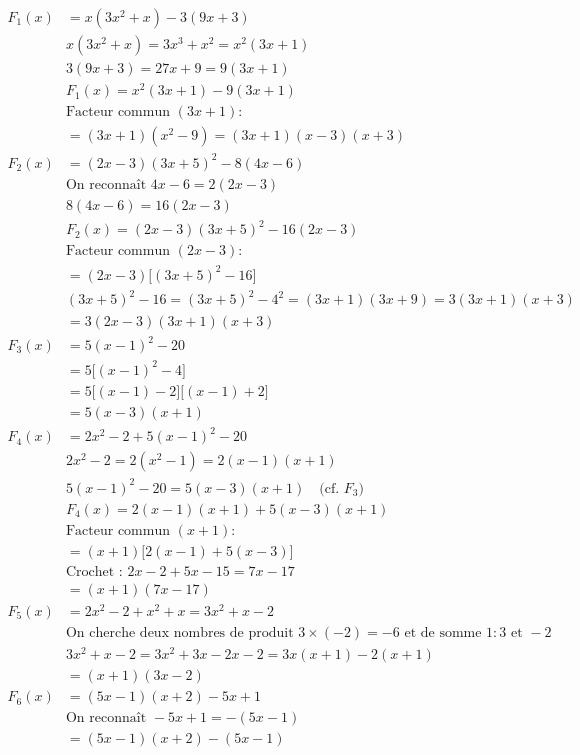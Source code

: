 \documentclass[11pt]{article}
\begin{document}
	\[
	\begin{aligned}
		F_1(x) &= x(3x^2+x)-3(9x+3)\\
		&x(3x^2+x) = 3x^3+x^2 = x^2(3x+1)\\
		&3(9x+3) = 27x+9 = 9(3x+1)\\
		&F_1(x) = x^2(3x+1)-9(3x+1)\\
		&\text{Facteur commun } (3x+1) :\\
		&= (3x+1)(x^2-9) = (3x+1)(x-3)(x+3)\\[6pt]
		F_2(x) &= (2x-3)(3x+5)^2-8(4x-6)\\
		&\text{On reconnaît } 4x-6=2(2x-3)\\
		&8(4x-6) = 16(2x-3)\\
		&F_2(x) = (2x-3)(3x+5)^2-16(2x-3)\\
		&\text{Facteur commun } (2x-3) :\\
		&= (2x-3)\big[(3x+5)^2-16\big]\\
		&(3x+5)^2-16 = (3x+5)^2-4^2 = (3x+1)(3x+9) = 3(3x+1)(x+3)\\
		&= 3(2x-3)(3x+1)(x+3)\\[6pt]
		F_3(x) &= 5(x-1)^2-20\\
		&= 5\big[(x-1)^2-4\big]\\
		&= 5\big[(x-1)-2\big]\big[(x-1)+2\big]\\
		&= 5(x-3)(x+1)\\[6pt]
		F_4(x) &= 2x^2-2+5(x-1)^2-20\\
		&2x^2-2 = 2(x^2-1) = 2(x-1)(x+1)\\
		&5(x-1)^2-20 = 5(x-3)(x+1) \quad \text{(cf. } F_3\text{)}\\
		&F_4(x) = 2(x-1)(x+1)+5(x-3)(x+1)\\
		&\text{Facteur commun } (x+1) :\\
		&= (x+1)\big[2(x-1)+5(x-3)\big]\\
		&\text{Crochet : } 2x-2+5x-15 = 7x-17\\
		&= (x+1)(7x-17)\\[6pt]
		F_5(x) &= 2x^2-2+x^2+x = 3x^2+x-2\\
		&\text{On cherche deux nombres de produit } 3\times(-2)=-6 \text{ et de somme } 1 : 3 \text{ et } -2\\
		&3x^2+x-2 = 3x^2+3x-2x-2 = 3x(x+1)-2(x+1)\\
		&= (x+1)(3x-2)\\[6pt]
		F_6(x) &= (5x-1)(x+2)-5x+1\\
		&\text{On reconnaît } -5x+1 = -(5x-1)\\
		&= (5x-1)(x+2)-(5x-1)\\

\end{aligned}\]
\end{document}
